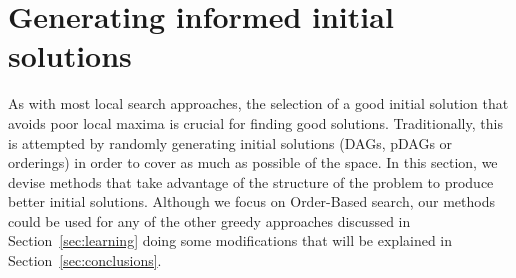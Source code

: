 \section{Generating informed initial solutions}
\label{sec:improve}

As with most local search approaches, the selection of a good initial solution that avoids poor local maxima is crucial for finding good solutions. Traditionally, this is attempted by randomly generating initial solutions (DAGs, pDAGs or orderings) in order to cover as much as possible of the space. In this section, we devise methods that take advantage of the structure of the problem to produce better initial solutions. Although we focus on Order-Based search, our methods could be used for any of the other greedy approaches discussed in Section~\ref{sec:learning} doing some modifications that will be explained in Section~\ref{sec:conclusions}.


